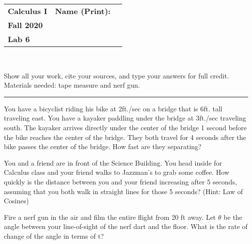 \documentclass[11pt]{exam}
\newcommand{\class}{Calculus I}
\newcommand{\term}{Fall 2020}
\newcommand{\examnum}{Lab 6}
\newcommand{\examdate}{August 20, 2020}
\begin{document}
 
	
	\pagestyle{head}
	\firstpageheader{}{}{}
	\runningheader{\class}{\examnum\ - Page \thepage\ of \numpages}{\term}
	\runningheadrule
	
	\begin{flushright}
		\begin{tabular}{p{2.8in} r l}
			\textbf{\class} & \textbf{Name (Print):} & \makebox[2in]{\hrulefill}\\
			\textbf{\term} &&\\
			\textbf{\examnum} &&\\
		\end{tabular}\\
	\end{flushright}
	
Show all your work, cite your sources, and type your answers for full credit.\\

Materials needed: tape measure and nerf gun.
	
	\rule[1ex]{\textwidth}{.1pt}
	
	\setlength{\columnsep}{0.5 in}
	
	\begin{questions}
		
		\addpoints
		
		\question[5] You have a bicyclist riding his bike at 2ft./sec on a bridge that is 6ft. tall traveling east.  You have a kayaker paddling under the bridge at 3ft./sec traveling south.  The kayaker arrives directly under the center of the bridge 1 second before the bike reaches the center of the bridge.  They both travel for 4 seconds after the bike passes the center of the bridge.  How fast are they separating?
		
		
		\question[10] You and a friend are in front of the Science Building.  You head inside for Calculus class and your friend walks to Jazzman’s to grab some coffee.  How quickly is the distance between you and your friend increasing after 5 seconds, assuming that you both walk in straight lines for those 5 seconds?  (Hint:  Law of Cosines)
		
		\question[10] Fire a nerf gun in the air and film the entire flight from 20 ft away.  Let $\theta$ be the angle between your line-of-sight of the nerf dart and the floor.  What is the rate of change of the angle in terms of t?
			
		
		
	\end{questions}
	
\end{document}

